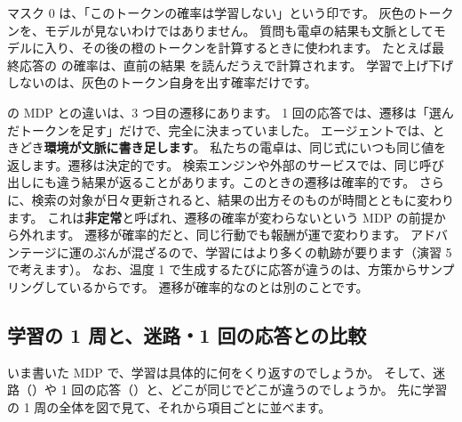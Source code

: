 マスク 0 は、「このトークンの確率は学習しない」という印です。
灰色のトークンを、モデルが見ないわけではありません。
質問も電卓の結果も文脈としてモデルに入り、その後の橙のトークンを計算するときに使われます。
たとえば最終応答の  の確率は、直前の結果  を読んだうえで計算されます。
学習で上げ下げしないのは、灰色のトークン自身を出す確率だけです。

の MDP との違いは、3 つ目の遷移にあります。
1 回の応答では、遷移は「選んだトークンを足す」だけで、完全に決まっていました。
エージェントでは、ときどき\textbf{環境が文脈に書き足します}。
私たちの電卓は、同じ式にいつも同じ値を返します。遷移は決定的です。
検索エンジンや外部のサービスでは、同じ呼び出しにも違う結果が返ることがあります。このときの遷移は確率的です。
さらに、検索の対象が日々更新されると、結果の出方そのものが時間とともに変わります。
これは\textbf{非定常}と呼ばれ、遷移の確率が変わらないという MDP の前提から外れます。
遷移が確率的だと、同じ行動でも報酬が運で変わります。
アドバンテージに運のぶんが混ざるので、学習にはより多くの軌跡が要ります（演習 5 で考えます）。
なお、温度 1 で生成するたびに応答が違うのは、方策からサンプリングしているからです。
遷移が確率的なのとは別のことです。

\subsection{学習の 1 周と、迷路・1 回の応答との比較}\label{sec:arl-cycle}

いま書いた MDP で、学習は具体的に何をくり返すのでしょうか。
そして、迷路（）や 1 回の応答（）と、どこが同じでどこが違うのでしょうか。
先に学習の 1 周の全体を図で見て、それから項目ごとに並べます。

